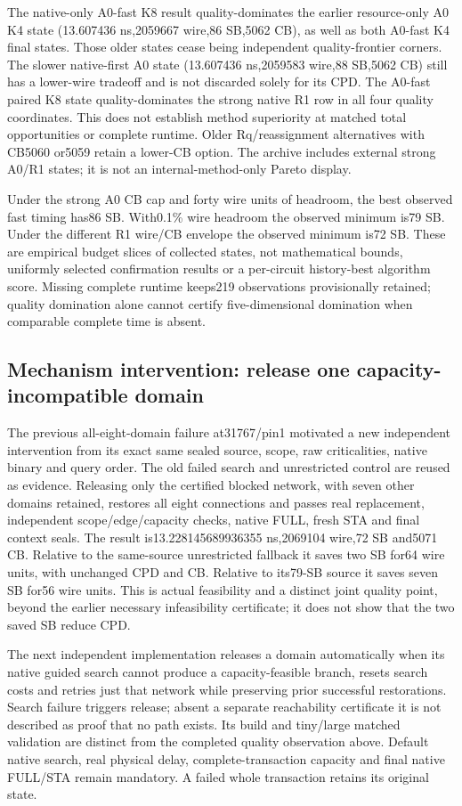 The native-only A0-fast K8 result quality-dominates the earlier resource-only A0 K4 state (13.607436 ns,2059667 wire,86 SB,5062 CB), as well as both A0-fast K4 final states. Those older states cease being independent quality-frontier corners. The slower native-first A0 state (13.607436 ns,2059583 wire,88 SB,5062 CB) still has a lower-wire tradeoff and is not discarded solely for its CPD. The A0-fast paired K8 state quality-dominates the strong native R1 row in all four quality coordinates. This does not establish method superiority at matched total opportunities or complete runtime. Older Rq/reassignment alternatives with CB5060 or5059 retain a lower-CB option. The archive includes external strong A0/R1 states; it is not an internal-method-only Pareto display.

Under the strong A0 CB cap and forty wire units of headroom, the best observed fast timing has86 SB. With0.1\% wire headroom the observed minimum is79 SB. Under the different R1 wire/CB envelope the observed minimum is72 SB. These are empirical budget slices of collected states, not mathematical bounds, uniformly selected confirmation results or a per-circuit history-best algorithm score. Missing complete runtime keeps219 observations provisionally retained; quality domination alone cannot certify five-dimensional domination when comparable complete time is absent.

\subsection{Mechanism intervention: release one capacity-incompatible domain}
The previous all-eight-domain failure at31767/pin1 motivated a new independent intervention from its exact same sealed source, scope, raw criticalities, native binary and query order. The old failed search and unrestricted control are reused as evidence. Releasing only the certified blocked network, with seven other domains retained, restores all eight connections and passes real replacement, independent scope/edge/capacity checks, native FULL, fresh STA and final context seals. The result is13.228145689936355 ns,2069104 wire,72 SB and5071 CB. Relative to the same-source unrestricted fallback it saves two SB for64 wire units, with unchanged CPD and CB. Relative to its79-SB source it saves seven SB for56 wire units. This is actual feasibility and a distinct joint quality point, beyond the earlier necessary infeasibility certificate; it does not show that the two saved SB reduce CPD.

The next independent implementation releases a domain automatically when its native guided search cannot produce a capacity-feasible branch, resets search costs and retries just that network while preserving prior successful restorations. Search failure triggers release; absent a separate reachability certificate it is not described as proof that no path exists. Its build and tiny/large matched validation are distinct from the completed quality observation above. Default native search, real physical delay, complete-transaction capacity and final native FULL/STA remain mandatory. A failed whole transaction retains its original state.

